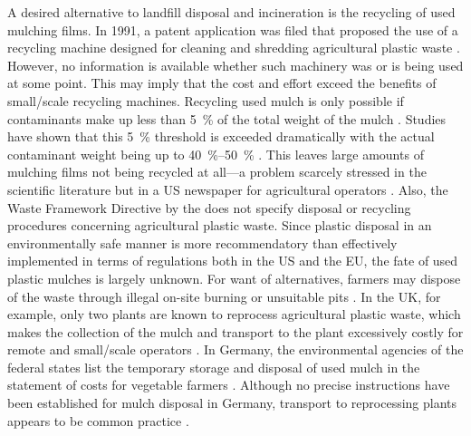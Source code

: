 A desired alternative to landfill disposal and incineration is the recycling of used mulching films. In 1991, a patent application was filed that proposed the use of a recycling machine designed for cleaning and shredding agricultural plastic waste \citep{VacchelliAnlage1992}. However, no information is available whether such machinery was or is being used at some point. This may imply that the cost and effort exceed the benefits of small\-/scale recycling machines. Recycling used mulch is only possible if contaminants make up less than \SI{5}{\percent} of the total weight of the mulch \citep{ClarkeRecycling1996}. Studies have shown that this \SI{5}{\percent} threshold is exceeded dramatically with the actual contaminant weight being up to \SIrange{40}{50}{\percent} \citep{HussainPlastics2003, LevitanRecycling2003,NerinAssessing1999}. This leaves large amounts of mulching films not being recycled at all---a problem scarcely stressed in the scientific literature but in a US newspaper for agricultural operators \citep{KotrbaWhat2008}.
Also, the Waste Framework Directive by the \citet{EuropeanParliamentDirective2008} does not specify disposal or recycling procedures concerning agricultural plastic waste. Since plastic disposal in an environmentally safe manner is more recommendatory than effectively implemented in terms of regulations both in the US and the EU, the fate of used plastic mulches is largely unknown.
For want of alternatives, farmers may dispose of the waste through illegal on-site burning or unsuitable pits \citep{HemphillAgricultural1993, Scarascia-MugnozzaPlastic2011}. In the UK, for example, only two
plants are known to reprocess agricultural plastic waste, which makes the collection of the mulch and transport to the plant excessively costly for remote and small\-/scale operators \citep{ScottishExecutiveEnvironmentGroupCode2006}. In Germany, the environmental agencies of the federal states list the temporary storage and disposal of used mulch in the statement of costs for vegetable farmers \citep{BayerischeLandesanstaltfurLandwirtschaftFeldgemuseanbau2005}. Although no precise instructions have been established for mulch disposal in Germany, transport to reprocessing plants appears to be common practice \citep{StraeterAlles2011}.

